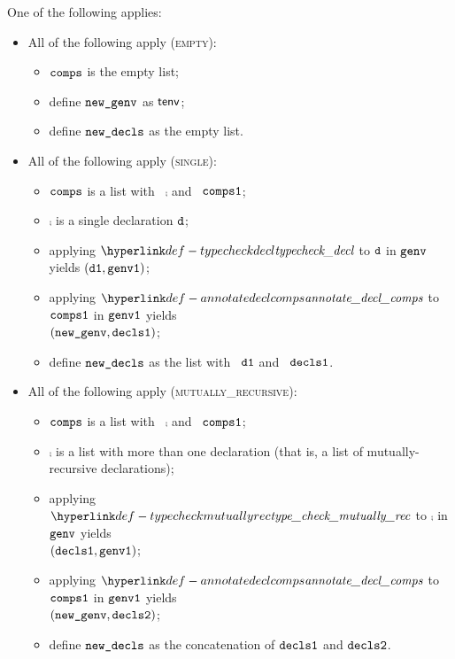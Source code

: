 \ProseParagraph
One of the following applies:
\begin{itemize}
  \item All of the following apply (\textsc{empty}):
  \begin{itemize}
    \item $\texttt{comps}$ is the empty list;
    \item define $\texttt{new\_genv}$ as $\textsf{tenv}$;
    \item define $\texttt{new\_decls}$ as the empty list.
  \end{itemize}

  \item All of the following apply (\textsc{single}):
  \begin{itemize}
    \item $\texttt{comps}$ is a list with \head\ $\comp$ and \tail\ $\texttt{comps1}$;
    \item $\comp$ is a single declaration $\texttt{d}$;
    \item applying $\typecheckdecl$ to $\texttt{d}$ in $\texttt{genv}$ yields $(\texttt{d1}, \texttt{genv1})$\ProseOrTypeError;
    \item applying $\annotatedeclcomps$ to $\texttt{comps1}$ in $\texttt{genv1}$ yields \\ $(\texttt{new\_genv}, \texttt{decls1})$\ProseOrTypeError;
    \item define $\texttt{new\_decls}$ as the list with \head\ $\texttt{d1}$ and \tail\ $\texttt{decls1}$.
  \end{itemize}

  \item All of the following apply (\textsc{mutually\_recursive}):
  \begin{itemize}
    \item $\texttt{comps}$ is a list with \head\ $\comp$ and \tail\ $\texttt{comps1}$;
    \item $\comp$ is a list with more than one declaration (that is, a list of mutually-recursive declarations);
    \item applying $\typecheckmutuallyrec$ to $\comp$ in $\texttt{genv}$ yields \\ $(\texttt{decls1}, \texttt{genv1})$\ProseOrTypeError;
    \item applying $\annotatedeclcomps$ to $\texttt{comps1}$ in $\texttt{genv1}$ yields \\ $(\texttt{new\_genv}, \texttt{decls2})$\ProseOrTypeError;
    \item define $\texttt{new\_decls}$ as the concatenation of $\texttt{decls1}$ and $\texttt{decls2}$.
  \end{itemize}
\end{itemize}

